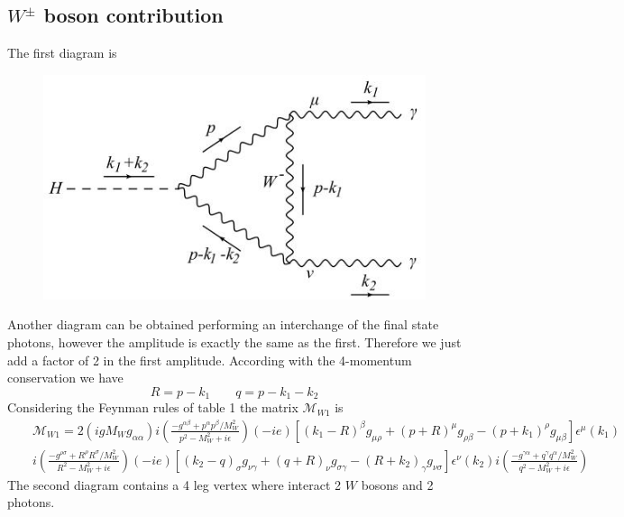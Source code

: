 \documentclass[a4paper,10pt]{article}
\begin{document}
\subsection{$W^{\pm}$ boson contribution}
The first diagram is
\begin{figure}[h]
\begin{center}
\includegraphics[scale=0.5]{./foto1.jpeg}
\end{center}
\end{figure}
\newline
Another diagram can be obtained performing an interchange of the final state photons, however  the amplitude is exactly the same as the first. Therefore we just add a factor of 2 in the first amplitude. According with the 4-momentum conservation we have
\begin{equation}
R=p-k_1 \qquad q = p-k_1-k_2
\end{equation}
Considering the Feynman rules of table 1 the matrix $\mathscr{M}_{W1}$ is
\begin{eqnarray*}
&&\mathscr{M}_{W1} = 2(igM_W g_{\alpha\alpha}) i\left(\frac{-g^{\alpha\beta} + p^{\alpha}p^{\beta}/M_W^2}{p^2-M_W^2+i\epsilon}\right) (-ie) \left[(k_1-R)^{\beta}g_{\mu\rho} + (p+R)^{\mu}g_{\rho\beta} - (p+k_1)^{\rho}g_{\mu\beta} \right]\epsilon^{\mu}(k_1) \\
&&i\left(\frac{-g^{\rho\sigma} + R^{\rho}R^{\sigma}/M_W^2}{R^2-M_W^2+i\epsilon}\right) (-ie) \left[(k_2-q)_{\sigma}g_{\nu\gamma} + (q+R)_{\nu}g_{\sigma\gamma} -(R+k_2)_{\gamma}g_{\nu\sigma} \right]\epsilon^{\nu}(k_2) i\left(\frac{-g^{\gamma\alpha} + q^{\gamma}q^{\alpha}/M_W^2}{q^2-M_W^2+i\epsilon}\right)
\end{eqnarray*}
The second diagram contains a 4 leg vertex where interact 2 $W$ bosons and 2 photons.
\end{document}
